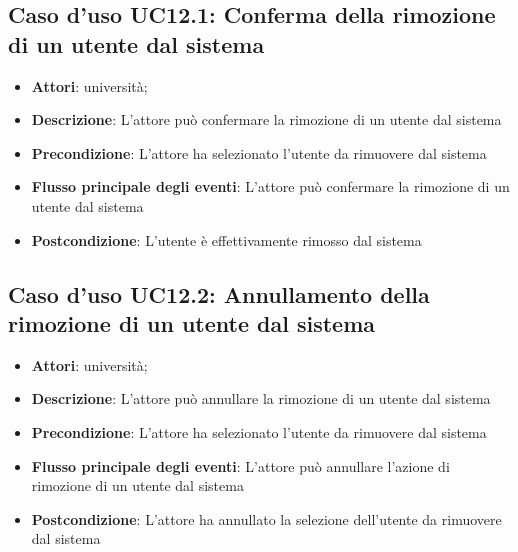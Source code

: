 \subsection{Caso d'uso \texorpdfstring{UC12.1}{UC12.1}: Conferma della rimozione di un utente dal sistema}
\begin{itemize}
\item \textbf{Attori}: università;
\item \textbf{Descrizione}: L'attore può confermare la rimozione di un utente dal sistema
\item \textbf{Precondizione}: L'attore ha selezionato l'utente da rimuovere dal sistema
\item \textbf{Flusso principale degli eventi}: L'attore può confermare la rimozione di un utente dal sistema
\item \textbf{Postcondizione}: L'utente è effettivamente rimosso dal sistema
\end{itemize}
\subsection{Caso d'uso \texorpdfstring{UC12.2}{UC12.2}: Annullamento della rimozione di un utente dal sistema}
\begin{itemize}
\item \textbf{Attori}: università;
\item \textbf{Descrizione}: L'attore può annullare la rimozione di un utente dal sistema
\item \textbf{Precondizione}: L'attore ha selezionato l'utente da rimuovere dal sistema
\item \textbf{Flusso principale degli eventi}: L'attore può annullare l'azione di rimozione di un utente dal sistema
\item \textbf{Postcondizione}: L'attore ha annullato la selezione dell'utente da rimuovere dal sistema
\end{itemize}

